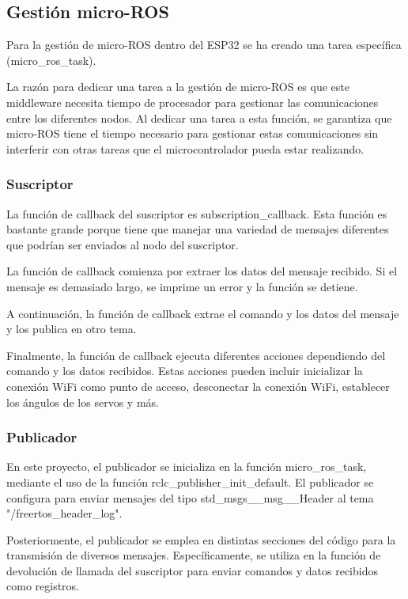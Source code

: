 \subsection{Gestión micro-ROS}
Para la gestión de micro-ROS dentro del ESP32 se ha creado una tarea específica (micro\_ros\_task).



La razón para dedicar una tarea a la gestión de micro-ROS es que este middleware necesita tiempo de procesador para gestionar las comunicaciones entre los diferentes nodos. Al dedicar una tarea a esta función, se garantiza que micro-ROS tiene el tiempo necesario para gestionar estas comunicaciones sin interferir con otras tareas que el microcontrolador pueda estar realizando.

\subsubsection{Suscriptor}
La función de callback del suscriptor es subscription\_callback. Esta función es bastante grande porque tiene que manejar una variedad de mensajes diferentes que podrían ser enviados al nodo del suscriptor.



La función de callback comienza por extraer los datos del mensaje recibido. Si el mensaje es demasiado largo, se imprime un error y la función se detiene.



A continuación, la función de callback extrae el comando y los datos del mensaje y los publica en otro tema.



Finalmente, la función de callback ejecuta diferentes acciones dependiendo del comando y los datos recibidos. Estas acciones pueden incluir inicializar la conexión WiFi como punto de acceso, desconectar la conexión WiFi, establecer los ángulos de los servos y más.

\subsubsection{Publicador}
En este proyecto, el publicador se inicializa en la función micro\_ros\_task, mediante el uso de la función rclc\_publisher\_init\_default. El publicador se configura para enviar mensajes del tipo std\_msgs\_\_msg\_\_Header al tema "/freertos\_header\_log".



Posteriormente, el publicador se emplea en distintas secciones del código para la transmisión de diversos mensajes. Específicamente, se utiliza en la función de devolución de llamada del suscriptor para enviar comandos y datos recibidos como registros.



